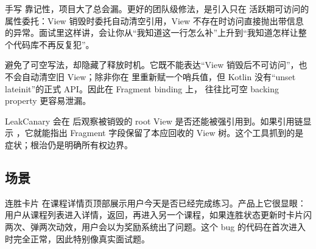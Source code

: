 \begin{idea}[把纪律性问题变成结构性问题]
手写  靠记性，项目大了总会漏。更好的团队级修法，是引入只在  活跃期可访问的  属性委托：View 销毁时委托自动清空引用，View 不存在时访问直接抛出带信息的异常。面试里这样讲，会让你从“我知道这一行怎么补”上升到“我知道怎样让整个代码库不再反复犯”。
\end{idea}

\begin{followup}
 避免了可空写法，却隐藏了释放时机。它既不能表达“View 销毁后不可访问”，也不会自动清空旧 View；除非你在  里重新赋一个哨兵值，但 Kotlin 没有“unset lateinit”的正式 API。因此在 Fragment binding 上， 往往比可空 backing property 更容易泄漏。
\end{followup}

\begin{followup}
LeakCanary 会在  后观察被销毁的 root View 是否还能被强引用到。如果引用链显示 ，它就能指出 Fragment 字段保留了本应回收的 View 树。这个工具抓到的是症状；根治仍是明确所有权边界。
\end{followup}


\subsection*{场景}
连胜卡片  在课程详情页顶部展示用户今天是否已经完成练习。产品上它很显眼：用户从课程列表进入详情，返回，再进入另一个课程，如果连胜状态更新时卡片闪两次、弹两次动效，用户会以为奖励系统出了问题。这个 bug 的代码在首次进入时完全正常，因此特别像真实面试题。


